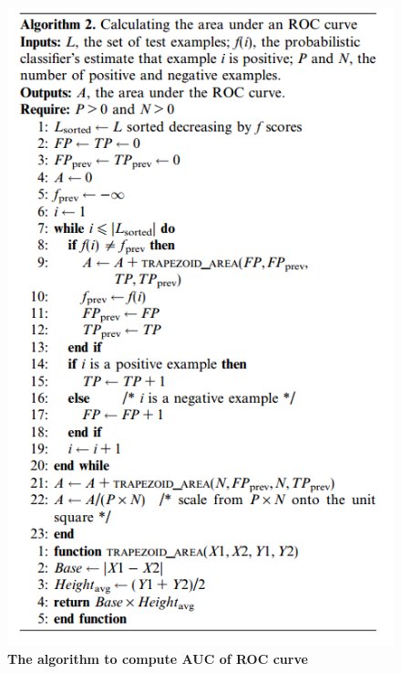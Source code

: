 \documentclass[11pt]{article}
\begin{document}
\begin{figure}
\begin{minipage}[t]{1\linewidth}
  \centering
  \centerline{\includegraphics[scale = 0.5]{auc.png}}
\end{minipage}
\caption{\footnotesize{\textbf{The algorithm to compute AUC of ROC curve \citep{fawcett2006introduction}}}}
\label{fig: auc}
\end{figure}
\end{document}
